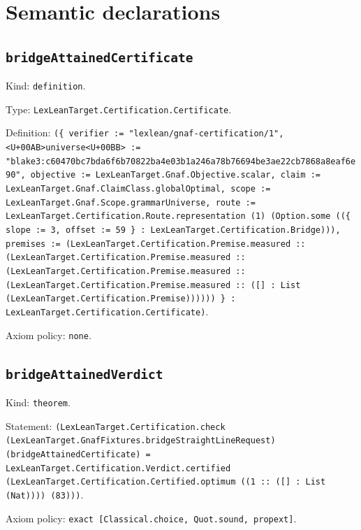 \documentclass[11pt]{article}
\begin{document}
\section*{Semantic declarations}
\subsection*{\texttt{bridgeAttainedCertificate}}
\noindent Kind: \texttt{definition}.\par
\noindent Type: \texttt{LexLeanTarget.Certification.Certificate}.\par
\noindent Definition: \texttt{(\{ verifier := "lexlean/gnaf-certification/1", <U+00AB>universe<U+00BB> := "blake3:c60470bc7bda6f6b70822ba4e03b1a246a78b76694be3ae22cb7868a8eaf6e90", objective := LexLeanTarget.Gnaf.Objective.scalar, claim := LexLeanTarget.Gnaf.ClaimClass.globalOptimal, scope := LexLeanTarget.Gnaf.Scope.grammarUniverse, route := LexLeanTarget.Certification.Route.representation (1) (Option.some ((\{ slope := 3, offset := 59 \} : LexLeanTarget.Certification.Bridge))), premises := (LexLeanTarget.Certification.Premise.measured :: (LexLeanTarget.Certification.Premise.measured :: (LexLeanTarget.Certification.Premise.measured :: (LexLeanTarget.Certification.Premise.measured :: ([] : List (LexLeanTarget.Certification.Premise)))))) \} : LexLeanTarget.Certification.Certificate)}.\par
\noindent Axiom policy: \texttt{none}.\par
\subsection*{\texttt{bridgeAttainedVerdict}}
\noindent Kind: \texttt{theorem}.\par
\noindent Statement: \texttt{(LexLeanTarget.Certification.check (LexLeanTarget.GnafFixtures.bridgeStraightLineRequest) (bridgeAttainedCertificate) = LexLeanTarget.Certification.Verdict.certified (LexLeanTarget.Certification.Certified.optimum ((1 :: ([] : List (Nat)))) (83)))}.\par
\noindent Axiom policy: \texttt{exact [Classical.choice, Quot.sound, propext]}.\par
\end{document}
